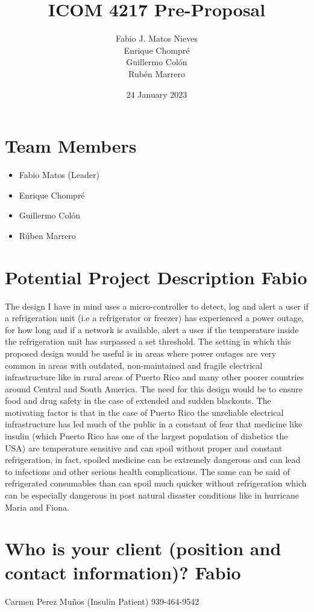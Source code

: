 \documentclass[12pt]{article}
\title{ICOM 4217 Pre-Proposal}
\author{Fabio J. Matos Nieves\\
  Enrique Chompré\\
  Guillermo Colón\\
Rubén Marrero}
\date{24 January 2023}
\begin{document}
\maketitle
\newpage
\thispagestyle{empty}
\pagestyle{plain}
\section{Team Members}
\begin{itemize}
  \item Fabio Matos (Leader)
  \item Enrique Chompré
  \item Guillermo Colón
  \item Rúben Marrero
\end{itemize} 
\newpage
\section{Potential Project Description Fabio}
The design I have in mind uses a micro-controller to detect, log and alert a user if a refrigeration unit (i.e a refrigerator or freezer) has experienced a power outage, for how long and if a network is available, alert a user if the temperature inside the refrigeration unit has surpassed a set threshold. The setting in which this proposed design would be useful is in areas where power outages are very common in areas with outdated, non-maintained and fragile electrical infrastructure like in rural areas of Puerto Rico and many other poorer countries around Central and South America. The need for this design would be to ensure food and drug safety in the case of extended and sudden blackouts. The motivating factor is that in the case of Puerto Rico the unreliable electrical infrastructure has led much of the public in a constant of fear that medicine like insulin (which Puerto Rico has one of the largest population of diabetics the USA) are temperature sensitive and can spoil without proper and constant refrigeration, in fact, spoiled medicine can be extremely dangerous and can lead to infections and other serious health complications. The same can be said of refrigerated consumables than can spoil much quicker without refrigeration which can be especially dangerous in post natural disaster conditions like in hurricane Maria and Fiona.
\newpage
\section{Who is your client (position and contact information)? Fabio}
Carmen Perez Muños (Insulin Patient) 939-464-9542
\newpage

\newpage

\end{document}
